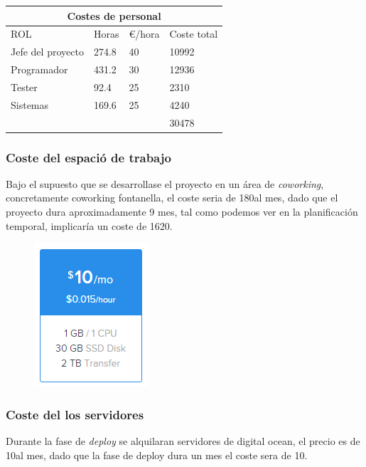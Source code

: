 \setlength{\arrayrulewidth}{1mm}
\setlength{\tabcolsep}{12pt}
\renewcommand{\arraystretch}{2.5}
{
\begin{tabular}{ |p{2cm}|p{2cm}|p{2cm}|p{2cm}|}
\hline
\multicolumn{4}{|c|}{Costes de personal} \\
\hline
ROL &Horas & \euro /hora &Coste total \\
\hline
Jefe del proyecto &274.8 &40 & 10992\\
Programador &431.2 &30 & 12936\\
Tester &92.4 &25 & 2310\\
Sistemas &169.6 &25 &4240\\
&&& 30478\\
\hline
\end{tabular}
}
\newpage

\subsubsection{Coste del espació de trabajo}

Bajo el supuesto que se desarrollase el proyecto en un área de \textit{coworking}, concretamente coworking fontanella, el coste seria de 180\euros al mes, dado que el proyecto dura aproximadamente 9 mes, tal como podemos ver en la planificación temporal, implicaría un coste de 1620\euros.

\begin{figure}[ht!]
\center
\includegraphics[scale=1.0]{add/do_server.PNG}
\label{fig:Precio y especificaciones del servidor}
\end{figure}
\subsubsection{Coste del los servidores}
Durante la fase de \textit{deploy} se alquilaran servidores de digital ocean, el precio es de 10\euros al mes, dado que la fase de deploy dura un mes el coste sera de 10\euros .\linebreak


